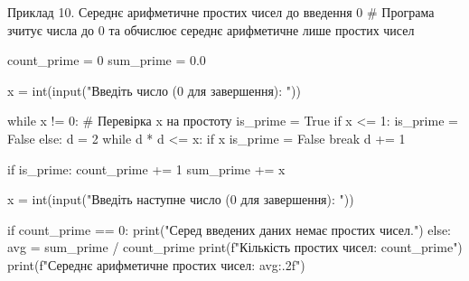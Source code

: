 \documentclass{scrreprt}
\begin{document}
	\begin{py}{Приклад 10. Середнє арифметичне простих чисел до введення 0}
# Програма зчитує числа до 0 та обчислює середнє арифметичне лише простих чисел

count_prime = 0
sum_prime = 0.0

x = int(input("Введіть число (0 для завершення): "))

while x != 0:
    # Перевірка x на простоту
    is_prime = True
    if x <= 1:
        is_prime = False
    else:
        d = 2
        while d * d <= x:
            if x %
                is_prime = False
                break
            d += 1
            
    if is_prime:
        count_prime += 1
        sum_prime += x
        
    x = int(input("Введіть наступне число (0 для завершення): "))

if count_prime == 0:
    print("Серед введених даних немає простих чисел.")
else:
    avg = sum_prime / count_prime
    print(f"Кількість простих чисел: {count_prime}")
    print(f"Середнє арифметичне простих чисел: {avg:.2f}")
	\end{py}
	
	\newpage
	
	
\end{document}
